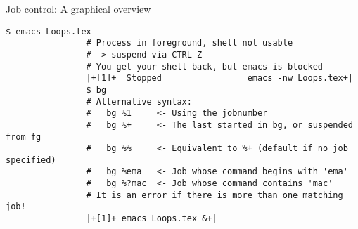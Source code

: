\begin{frame}[fragile]{Job control: A graphical overview}
\begin{overlayarea}{\textwidth}{0.7\textheight}
\begin{onlyenv}
\begin{lstlisting}[style=MyBash, xrightmargin=2mm, xleftmargin=2mm, firstnumber=26]
                $ emacs Loops.tex
                # Process in foreground, shell not usable
                # -> suspend via CTRL-Z 
                # You get your shell back, but emacs is blocked
                |+[1]+  Stopped                 emacs -nw Loops.tex+|
                $ bg 
                # Alternative syntax:
                #   bg %1     <- Using the jobnumber
                #   bg %+     <- The last started in bg, or suspended from fg
                #   bg %%     <- Equivalent to %+ (default if no job specified)
                #   bg %ema   <- Job whose command begins with 'ema'
                #   bg %?mac  <- Job whose command contains 'mac'
                # It is an error if there is more than one matching job!
                |+[1]+ emacs Loops.tex &+|
            \end{lstlisting}
        \end{onlyenv}
    \end{overlayarea}
\end{frame}
